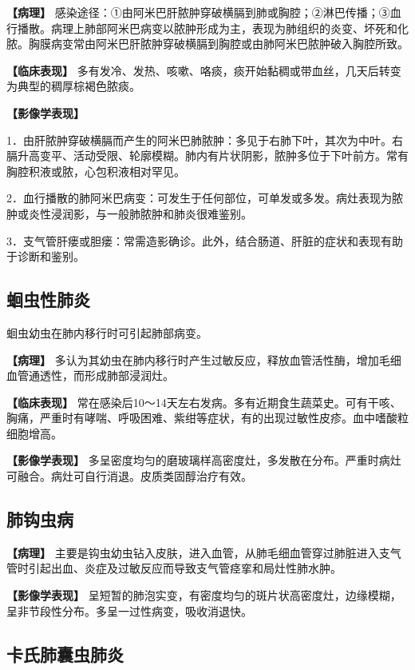 \textbf{【病理】}
感染途径：①由阿米巴肝脓肿穿破横膈到肺或胸腔；②淋巴传播；③血行播散。病理上肺部阿米巴病变以脓肿形成为主，表现为肺组织的炎变、坏死和化脓。胸膜病变常由阿米巴肝脓肿穿破横膈到胸腔或由肺阿米巴脓肿破入胸腔所致。

\textbf{【临床表现】}
多有发冷、发热、咳嗽、咯痰，痰开始黏稠或带血丝，几天后转变为典型的稠厚棕褐色脓痰。

\textbf{【影像学表现】}

1．由肝脓肿穿破横膈而产生的阿米巴肺脓肿：多见于右肺下叶，其次为中叶。右膈升高变平、活动受限、轮廓模糊。肺内有片状阴影，脓肿多位于下叶前方。常有胸腔积液或脓，心包积液相对罕见。

2．血行播散的肺阿米巴病变：可发生于任何部位，可单发或多发。病灶表现为脓肿或炎性浸润影，与一般肺脓肿和肺炎很难鉴别。

3．支气管肝瘘或胆瘘：常需造影确诊。此外，结合肠道、肝脏的症状和表现有助于诊断和鉴别。

\subsection{蛔虫性肺炎}

蛔虫幼虫在肺内移行时可引起肺部病变。

\textbf{【病理】}
多认为其幼虫在肺内移行时产生过敏反应，释放血管活性酶，增加毛细血管通透性，而形成肺部浸润灶。

\textbf{【临床表现】}
常在感染后10～14天左右发病。多有近期食生蔬菜史。可有干咳、胸痛，严重时有哮喘、呼吸困难、紫绀等症状，有的出现过敏性皮疹。血中嗜酸粒细胞增高。

\textbf{【影像学表现】}
多呈密度均匀的磨玻璃样高密度灶，多发散在分布。严重时病灶可融合。病灶可自行消退。皮质类固醇治疗有效。

\subsection{肺钩虫病}

\textbf{【病理】}
主要是钩虫幼虫钻入皮肤，进入血管，从肺毛细血管穿过肺脏进入支气管时引起出血、炎症及过敏反应而导致支气管痉挛和局灶性肺水肿。

\textbf{【影像学表现】}
呈短暂的肺泡实变，有密度均匀的斑片状高密度灶，边缘模糊，呈非节段性分布。多呈一过性病变，吸收消退快。

\subsection{卡氏肺囊虫肺炎}

